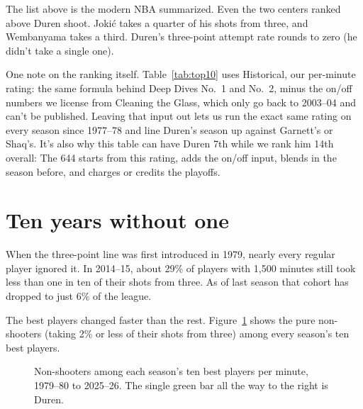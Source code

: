\documentclass[11pt]{article}
\begin{document}
The list above is the modern NBA summarized. Even the two centers ranked above Duren shoot.
Jokić takes a quarter of his shots from three, and Wembanyama takes a third. Duren's
three-point attempt rate rounds to zero (he didn't take a single
one).

One note on the ranking itself. Table~\ref{tab:top10} uses \gravity{} Historical, our
per-minute rating: the same formula behind Deep Dives No.~1 and No.~2, minus the on/off numbers we license from
Cleaning the Glass, which only go back to 2003--04 and can't be published. Leaving that input
out lets us run the exact same rating on every season since 1977--78 and line Duren's season
up against Garnett's or Shaq's. It's
also why this table can have Duren 7th while we rank him 14th overall: The 644 starts from
this rating, adds the on/off input, blends in the season before, and charges or credits the
playoffs.

\section*{Ten years without one}

When the three-point line was first introduced in 1979, nearly every regular player ignored
it. In 2014--15, about 29\% of players with 1,500 minutes still took less than one in ten of
their shots from three. As of last season that cohort has dropped to just 6\% of the league.

The best players changed faster than the rest. Figure~\ref{fig:extinct} shows the pure
non-shooters (taking 2\% or less of their shots from three) among every season's ten best
players.

\begin{figure}[h]
\centering
{}
\caption{Non-shooters among each season's ten best players per minute, 1979--80 to
2025--26. The single green bar all the way to the right is Duren.}
\label{fig:extinct}
\end{figure}
\end{document}
